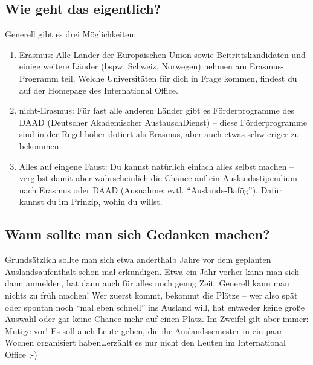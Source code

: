 \subsection{Wie geht das eigentlich?}
Generell gibt es drei Möglichkeiten:
\begin{enumerate}
	\item Erasmus: Alle Länder der Europäischen Union sowie Beitrittskandidaten und einige weitere Länder (bspw. Schweiz, Norwegen) nehmen am Erasmus-Programm teil. Welche Universitäten für dich in Frage kommen, findest du auf der Homepage des International Office.
	\item nicht-Erasmus: Für fast alle anderen Länder gibt es Förderprogramme des DAAD (Deutscher Akademischer AustauschDienst) -- diese Förderprogramme sind in der Regel höher dotiert als Erasmus, aber auch etwas schwieriger zu bekommen.
	\item Alles auf eingene Faust: Du kannst natürlich einfach alles selbst machen -- vergibst damit aber wahrscheinlich die Chance auf ein Auslandsstipendium nach Erasmus oder DAAD (Ausnahme: evtl. \enquote{Auslands-Bafög}). Dafür kannst du im Prinzip, wohin du willst.
\end{enumerate}

\subsection{Wann sollte man sich Gedanken machen?}
Grundsätzlich sollte man sich etwa anderthalb Jahre vor dem geplanten Auslandsaufenthalt schon mal erkundigen. Etwa ein Jahr vorher kann man sich dann anmelden, hat dann auch für alles noch genug Zeit. Generell kann man nichts zu früh machen! Wer zuerst kommt, bekommt die Plätze -- wer also spät oder spontan noch \enquote{mal eben schnell} ins Ausland will, hat entweder keine große Auswahl oder gar keine Chance mehr auf einen Platz. Im Zweifel gilt aber immer: Mutige vor! Es soll auch Leute geben, die ihr Auslandssemester in ein paar Wochen organisiert haben\ldots erzählt es nur nicht den Leuten im International Office ;-)

